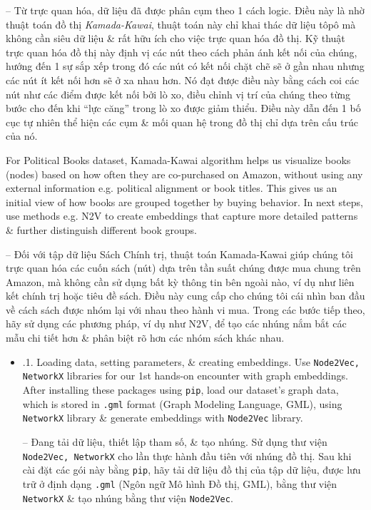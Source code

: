 \documentclass{article}
\begin{document}
\begin{itemize}
\begin{itemize}
        -- Từ trực quan hóa, dữ liệu đã được phân cụm theo 1 cách logic. Điều này là nhờ thuật toán đồ thị {\it Kamada-Kawai}, thuật toán này chỉ khai thác dữ liệu tôpô mà không cần siêu dữ liệu \& rất hữu ích cho việc trực quan hóa đồ thị. Kỹ thuật trực quan hóa đồ thị này định vị các nút theo cách phản ánh kết nối của chúng, hướng đến 1 sự sắp xếp trong đó các nút có kết nối chặt chẽ sẽ ở gần nhau nhưng các nút ít kết nối hơn sẽ ở xa nhau hơn. Nó đạt được điều này bằng cách coi các nút như các điểm được kết nối bởi lò xo, điều chỉnh vị trí của chúng theo từng bước cho đến khi ``lực căng'' trong lò xo được giảm thiểu. Điều này dẫn đến 1 bố cục tự nhiên thể hiện các cụm \& mối quan hệ trong đồ thị chỉ dựa trên cấu trúc của nó.

        For Political Books dataset, Kamada-Kawai algorithm helps us visualize books (nodes) based on how often they are co-purchased on Amazon, without using any external information e.g. political alignment or book titles. This gives us an initial view of how books are grouped together by buying behavior. In next steps, use methods e.g. N2V to create embeddings that capture more detailed patterns \& further distinguish different book groups.

        -- Đối với tập dữ liệu Sách Chính trị, thuật toán Kamada-Kawai giúp chúng tôi trực quan hóa các cuốn sách (nút) dựa trên tần suất chúng được mua chung trên Amazon, mà không cần sử dụng bất kỳ thông tin bên ngoài nào, ví dụ như liên kết chính trị hoặc tiêu đề sách. Điều này cung cấp cho chúng tôi cái nhìn ban đầu về cách sách được nhóm lại với nhau theo hành vi mua. Trong các bước tiếp theo, hãy sử dụng các phương pháp, ví dụ như N2V, để tạo các nhúng nắm bắt các mẫu chi tiết hơn \& phân biệt rõ hơn các nhóm sách khác nhau.
       \begin{itemize}
           \item {.1. Loading data, setting parameters, \& creating embeddings.} Use {\tt Node2Vec, NetworkX} libraries for our 1st hands-on encounter with graph embeddings. After installing these packages using {\tt pip}, load our dataset's graph data, which is stored in {\tt.gml} format (Graph Modeling Language, GML), using {\tt NetworkX} library \& generate embeddings with {\tt Node2Vec} library.

           -- {\sf Đang tải dữ liệu, thiết lập tham số, \& tạo nhúng.} Sử dụng thư viện {\tt Node2Vec, NetworkX} cho lần thực hành đầu tiên với nhúng đồ thị. Sau khi cài đặt các gói này bằng {\tt pip}, hãy tải dữ liệu đồ thị của tập dữ liệu, được lưu trữ ở định dạng {\tt.gml} (Ngôn ngữ Mô hình Đồ thị, GML), bằng thư viện {\tt NetworkX} \& tạo nhúng bằng thư viện {\tt Node2Vec}.


\end{itemize}
\end{itemize}
\end{itemize}
\end{document}
